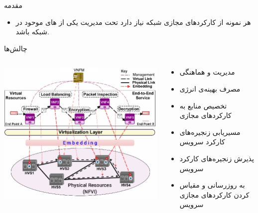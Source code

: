 \documentclass{beamer}
\makeatletter
\newcommand{\RTList}{\raggedleft\rightskip\@totalleftmargin}
\makeatother
\begin{document}
\begin{persian}
\begin{frame}{مقدمه}
\begin{itemize}
        \item هر نمونه از کارکردهای مجازی شبکه نیاز دارد تحت مدیریت یکی از های موحود در شبکه باشد.
    \end{itemize}
\end{frame}
\begin{frame}{چالش‌ها} %
    \begin{columns}
        \begin{column}{0.6\textwidth}
            \includegraphics[scale=0.35]{images/embedding.png}
        \end{column}
        \begin{column}{0.4\textwidth}
            \begin{itemize}\RTList{}
                \item مدیریت و هماهنگی
                \item مصرف بهینه‌ی انرژی
                \item تخصیص منابع به کارکردهای مجازی
                \item مسیریابی زنجیره‌های کارکرد سرویس
                \item پذیرش زنجیره‌های کارکرد سرویس
                \item به روزرسانی و مقیاس کردن کارکردهای مجازی سرویس
            \end{itemize}
        \end{column}
    \end{columns}

\end{frame}
\end{persian}
\end{document}
